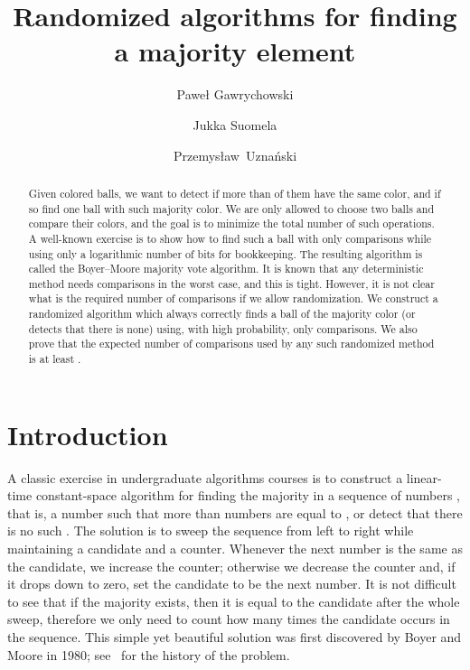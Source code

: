 \documentclass{article}[11pt,a4paper]
\title{Randomized algorithms for finding a majority element}
\author[1]{Pawe\l{} Gawrychowski}
\author[2]{Jukka Suomela}
\author[3]{Przemys\l{}aw~Uzna\'nski}
\affil[1]{Institute of Informatics, University of Warsaw, Poland}
\affil[2]{Helsinki Institute for Information Technology HIIT, \mbox{Department of Computer Science, Aalto University, Finland}}
\affil[3]{Department of Computer Science, ETH Z\"urich, Switzerland}
\date{}
\begin{document}
\maketitle

\begin{abstract}
Given  colored balls, we want to detect if more than  of them
have the same color, and if so find one ball with such majority color. We are only allowed
to choose two balls and compare their colors, and the goal is to minimize
the total number of such operations. A well-known exercise is to show how to find such
a ball with only  comparisons while using only a logarithmic number of bits for
bookkeeping. The resulting algorithm is called the Boyer--Moore
majority vote algorithm. It is known that any deterministic method needs
 comparisons in the worst case, and this is tight.
However, it is not clear what is the required
number of comparisons if we allow randomization. We construct a randomized
algorithm which always correctly finds a ball of the majority color (or detects that there is
none) using, with high probability, only  comparisons.
We also prove that the expected number of comparisons used by any such randomized
method is at least .
\end{abstract}

\section{Introduction}

A classic exercise in undergraduate algorithms courses is to construct a linear-time
constant-space algorithm for finding the majority in a sequence of  numbers
, that is, a number  such that more than 
numbers  are equal to , or detect that there is no such . The solution
is to sweep the sequence from left to right while maintaining a candidate and a counter.
Whenever the next number is the same as the candidate, we increase the counter;
otherwise we decrease the counter and, if it drops down to zero, set the candidate to
be the next number. It is not difficult to see that if the majority exists, then it is
equal to the candidate after the whole sweep, therefore we only need to count how
many times the candidate occurs in the sequence. This simple yet beautiful solution
was first discovered by Boyer and Moore in 1980; see~\cite{MJRTY} for the history of the problem.
\end{document}
